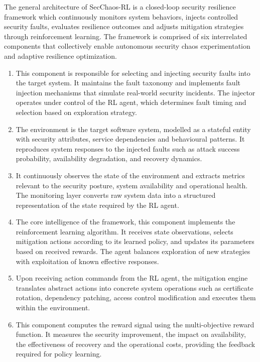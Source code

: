 \documentclass[conference,10pt]{IEEEtran}
\begin{document}
The general architecture of SecChaos-RL is a closed-loop security resilience framework which continuously monitors system behaviors, injects controlled security faults, evaluates resilience outcomes and adjusts mitigation strategies through reinforcement learning.  The framework is comprised of six interrelated components that collectively enable autonomous security chaos experimentation and adaptive resilience optimization. 
\begin{enumerate}
 \item  {} This component is responsible for selecting and injecting security faults into the target system. It maintains the fault taxonomy and implements fault injection mechanisms that simulate real-world security incidents. The injector operates under control of the RL agent, which determines fault timing and selection based on exploration strategy.
 \item {}The environment is the target software system, modelled as a stateful entity with security attributes, service dependencies and behavioural patterns. It reproduces system responses to the injected faults such as attack success probability, availability degradation, and recovery dynamics. 

 \item {} It continuously observes the state of the environment and extracts metrics relevant to the security posture, system availability and operational health. The monitoring layer converts raw system data into a structured representation of the state required by the RL agent. 

 \item {} The core intelligence of the framework, this component implements the reinforcement learning algorithm. It receives state observations, selects mitigation actions according to its learned policy, and updates its parameters based on received rewards. The agent balances exploration of new strategies with exploitation of known effective responses.

 \item {} Upon receiving action commands from the RL agent, the mitigation engine translates abstract actions into concrete system operations such as certificate rotation, dependency patching, access control modification and executes them within the environment.

 \item {} This component computes the reward signal using the multi-objective reward function. It measures the security improvement, the impact on availability, the effectiveness of recovery and the operational costs, providing the feedback required for policy learning.
\end{enumerate}
\end{document}
